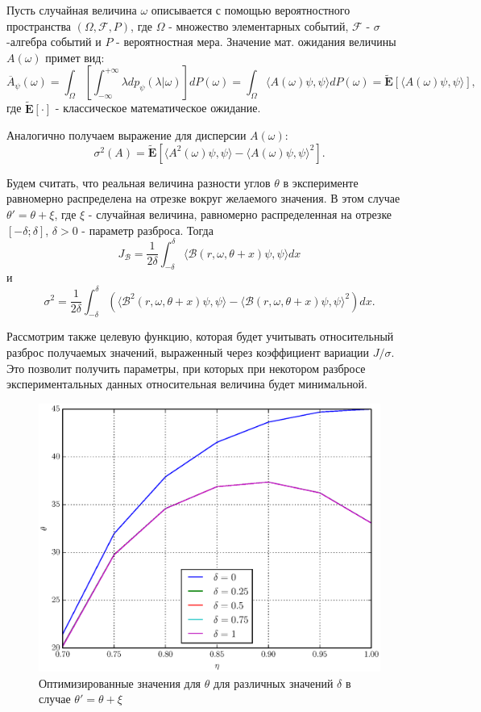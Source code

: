 \documentclass[%
master,         %
subf,           %
href,           %
colorlinks=true %
]{disser}
\numberwithin{equation}{section}
\numberwithin{figure}{section}
\begin{document}
Пусть случайная величина $\omega$ описывается с помощью вероятностного пространства $(\Omega, \mathcal{F}, P)$, где $\Omega$ - множество элементарных событий, $\mathcal{F}$ - $\sigma$-алгебра событий и $P$ - вероятностная мера. Значение мат. ожидания величины $A(\omega)$ примет вид:
\[
\overline{A}_\psi(\omega) = \int_\Omega\left[\int_{-\infty}^{+\infty}\lambda dp_\psi (\lambda|\omega)\right] dP(\omega) = \int_\Omega\langle A(\omega)\psi, \psi\rangle dP(\omega) = \mathbf{\tilde{E}}[ \langle A(\omega)\psi, \psi\rangle],
\]
где $\mathbf{\tilde{E}}[\cdot]$ - классическое математическое ожидание.

Аналогично получаем выражение для дисперсии $A(\omega)$:
\[
\sigma^2(A) = \mathbf{\tilde{E}}[ \langle A^2(\omega)\psi, \psi\rangle - \langle A(\omega)\psi, \psi\rangle^2].
\]

Будем считать, что реальная величина разности углов $\theta$ в эксперименте равномерно распределена на отрезке вокруг желаемого значения. В этом случае $\theta' = \theta + \xi$, где $\xi$ - случайная величина, равномерно распределенная на отрезке $[-\delta; \delta]$, $\delta > 0$ - параметр разброса. Тогда
\[
J_\mathcal{B} = \frac{1}{2\delta}\int_{-\delta}^\delta \langle \mathcal{B}(r, \omega, \theta + x)\psi, \psi \rangle dx
\] и
\[
\sigma^2 = \frac{1}{2\delta}\int_{-\delta}^\delta (\langle \mathcal{B}^2(r, \omega, \theta + x)\psi, \psi \rangle - \langle \mathcal{B}(r, \omega, \theta + x)\psi, \psi \rangle^2) dx.
\]


Рассмотрим также целевую функцию, которая будет учитывать относительный разброс получаемых значений, выраженный через коэффициент вариации $J / \sigma$. Это позволит получить параметры, при которых при некотором разбросе экспериментальных данных относительная величина будет минимальной.

\begin{figure}[h]
\includegraphics[scale=0.7]{theta_ang.eps}
\caption{Оптимизированные значения для $\theta$ для различных значений $\delta$ в случае $\theta' = \theta + \xi$}
\label{fig:theta_ang}
\end{figure}
\end{document}
